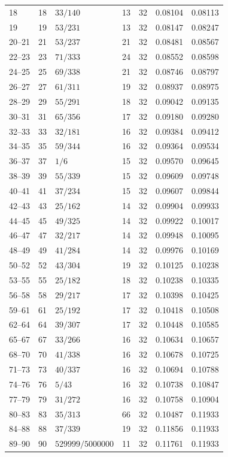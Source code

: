 \documentclass[11pt]{amsart}
\theoremstyle{definition}
\theoremstyle{remark}
\begin{document}
{\begin{longtable}{lllllll}
18 & 18 & $33/140$ & 13 & 32 & 0.08104 & 0.08113\\
19 & 19 & $53/231$ & 13 & 32 & 0.08147 & 0.08247\\
20--21 & 21 & $53/237$ & 21 & 32 & 0.08481 & 0.08567\\
22--23 & 23 & $71/333$ & 24 & 32 & 0.08552 & 0.08598\\
24--25 & 25 & $69/338$ & 21 & 32 & 0.08746 & 0.08797\\
26--27 & 27 & $61/311$ & 19 & 32 & 0.08937 & 0.08975\\
28--29 & 29 & $55/291$ & 18 & 32 & 0.09042 & 0.09135\\
30--31 & 31 & $65/356$ & 17 & 32 & 0.09180 & 0.09280\\
32--33 & 33 & $32/181$ & 16 & 32 & 0.09384 & 0.09412\\
34--35 & 35 & $59/344$ & 16 & 32 & 0.09364 & 0.09534\\
36--37 & 37 & $1/6$ & 15 & 32 & 0.09570 & 0.09645\\
38--39 & 39 & $55/339$ & 15 & 32 & 0.09609 & 0.09748\\
40--41 & 41 & $37/234$ & 15 & 32 & 0.09607 & 0.09844\\
42--43 & 43 & $25/162$ & 14 & 32 & 0.09904 & 0.09933\\
44--45 & 45 & $49/325$ & 14 & 32 & 0.09922 & 0.10017\\
46--47 & 47 & $32/217$ & 14 & 32 & 0.09948 & 0.10095\\
48--49 & 49 & $41/284$ & 14 & 32 & 0.09976 & 0.10169\\
50--52 & 52 & $43/304$ & 19 & 32 & 0.10125 & 0.10238\\
53--55 & 55 & $25/182$ & 18 & 32 & 0.10238 & 0.10335\\
56--58 & 58 & $29/217$ & 17 & 32 & 0.10398 & 0.10425\\
59--61 & 61 & $25/192$ & 17 & 32 & 0.10418 & 0.10508\\
62--64 & 64 & $39/307$ & 17 & 32 & 0.10448 & 0.10585\\
65--67 & 67 & $33/266$ & 16 & 32 & 0.10634 & 0.10657\\
68--70 & 70 & $41/338$ & 16 & 32 & 0.10678 & 0.10725\\
71--73 & 73 & $40/337$ & 16 & 32 & 0.10694 & 0.10788\\
74--76 & 76 & $5/43$ & 16 & 32 & 0.10738 & 0.10847\\
77--79 & 79 & $31/272$ & 16 & 32 & 0.10758 & 0.10904\\
80--83 & 83 & $35/313$ & 66 & 32 & 0.10487 & 0.11933\\
84--88 & 88 & $37/339$ & 19 & 32 & 0.11856 & 0.11933\\
89--90 & 90 & $529999/5000000$ & 11 & 32 & 0.11761 & 0.11933\\
\hline
\end{longtable}}
\end{document}
